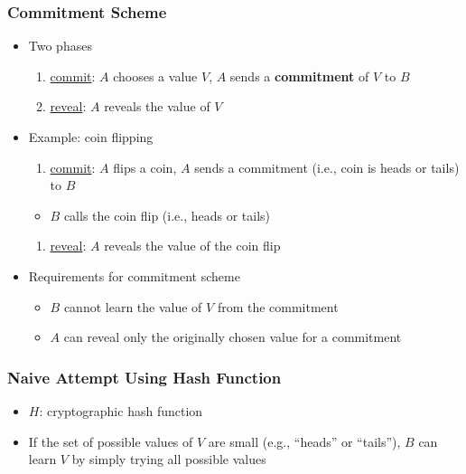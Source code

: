 \documentclass[final]{article}
\begin{document}
\subsubsection*{Commitment Scheme}
\begin{itemize}[nosep]
    \item Two phases
          \begin{enumerate}[nosep]
              \item \underline{commit}: $A$ chooses a value $V$, $A$ sends a \textbf{commitment} of $V$ to $B$
              \item \underline{reveal}: $A$ reveals the value of $V$
          \end{enumerate}
    \item Example: coin flipping
          \begin{enumerate}[nosep]
              \item \underline{commit}: $A$ flips a coin, $A$ sends a commitment (i.e., coin is heads or tails) to $B$
          \end{enumerate}
          \begin{itemize}[nosep]
              \item $B$ calls the coin flip (i.e., heads or tails)
          \end{itemize}
          \begin{enumerate}
              \item \underline{reveal}: $A$ reveals the value of the coin flip
          \end{enumerate}
    \item Requirements for commitment scheme
          \begin{itemize}[nosep]
              \item $B$ cannot learn the value of $V$ from the commitment
              \item $A$ can reveal only the originally chosen value for a commitment
          \end{itemize}
\end{itemize}
\subsubsection*{Naive Attempt Using Hash Function}
\begin{itemize}[nosep]
    \item $H$: cryptographic hash function
    \item If the set of possible values of $V$ are small (e.g., ``heads'' or ``tails''), $B$ can learn $V$ by simply trying all possible values
\end{itemize}
\end{document}
